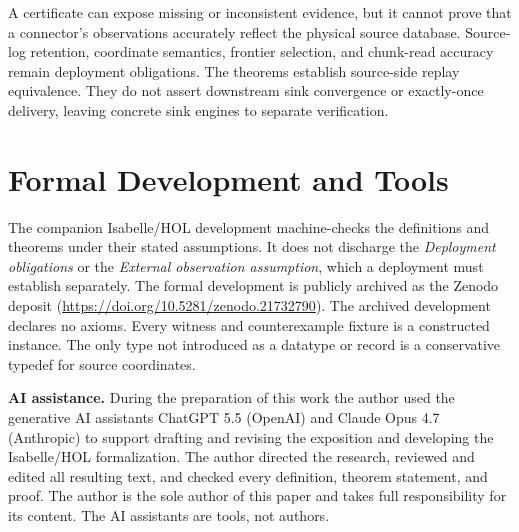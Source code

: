 \documentclass[letterpaper,10pt,twocolumn]{article}
\begin{document}
A certificate can expose missing or inconsistent evidence, but it
cannot prove that a connector's observations accurately reflect the
physical source database. Source-log retention, coordinate semantics,
frontier selection, and chunk-read accuracy remain deployment
obligations. The theorems establish source-side replay equivalence. 
They do not assert downstream sink convergence or exactly-once delivery, 
leaving concrete sink engines to separate verification.

\section*{Formal Development and Tools}\label{formal-development-and-tools}

The companion Isabelle/HOL development machine-checks the definitions
and theorems under their stated assumptions. It does not discharge the
\emph{Deployment obligations} or the \emph{External observation
assumption}, which a deployment must establish separately. The formal
development is publicly archived as
the Zenodo deposit \cite{andreakis2026dblog_virtual_cuts}
(\url{https://doi.org/10.5281/zenodo.21732790}). The archived
development declares no axioms. Every witness and counterexample
fixture is a constructed instance. The only type not introduced as a
datatype or record is a conservative typedef for source coordinates.

\smallskip
\noindent\textbf{AI assistance.} During the preparation of this work the author
used the generative AI assistants ChatGPT 5.5 (OpenAI)
and Claude Opus 4.7 (Anthropic) to support drafting and
revising the exposition and developing the Isabelle/HOL
formalization. The author directed the research, reviewed
and edited all resulting text, and checked every definition,
theorem statement, and proof. The author is the sole author
of this paper and takes full responsibility for its content. The
AI assistants are tools, not authors.


\end{document}
